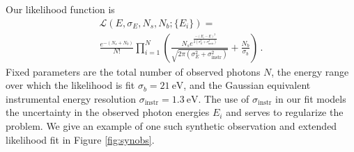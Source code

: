 \documentclass[aps,prd,10pt,twocolumn,superscriptaddress,showpacs,footinbib]{revtex4-1}
\newcommand{\units}[1]{~\mathrm{#1}}
\begin{document}
Our likelihood function is
\begin{multline}
	\mathcal{L}(E, \sigma_E, N_s, N_b; \{E_i\}) =\\
	\frac{e^{-(N_s+N_b)}}{N!} \prod_{i=1}^{N}
	\left(\frac{N_s e^{\frac{-(E_i-E)^2}{2(\sigma_E^2+\sigma_\mathrm{instr}^2)}}}
	{\sqrt{2\pi(\sigma_E^2+\sigma_\mathrm{instr}^2)}}+\frac{N_b}{\sigma_b}\right) \, .
\end{multline}
Fixed parameters are the total number
of observed photons $N$, the energy range over which the likelihood is fit $\sigma_b=21 \units{eV}$, 
and the Gaussian equivalent instrumental energy resolution $\sigma_\mathrm{instr}=1.3 \units{eV}$. The use of $\sigma_\mathrm{instr}$
in our fit models the uncertainty in the observed photon energies $E_i$ and serves to regularize the problem.
We give an example of one such synthetic observation and extended likelihood fit in Figure
\ref{fig:synobs}.


\end{document}
